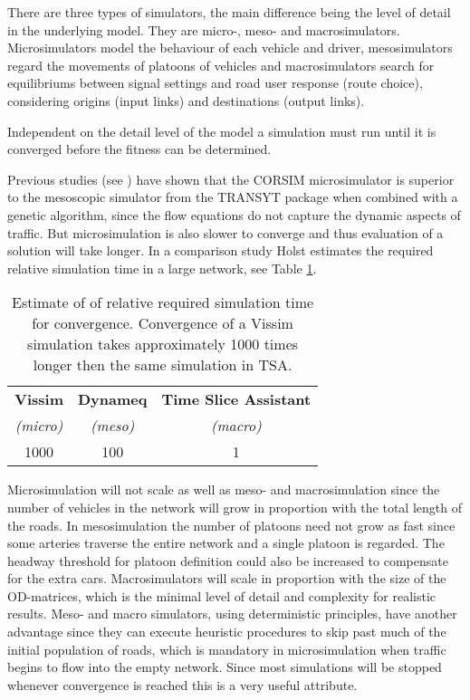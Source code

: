 There are three types of simulators, the main difference being the level of detail in the underlying model. They are micro-, meso- and macrosimulators. Microsimulators model the behaviour of each vehicle and driver, mesosimulators regard the movements of platoons of vehicles and macrosimulators search for equilibriums between signal settings and road user response (route choice), considering origins (input links) and destinations (output links).

Independent on the detail level of the model a simulation must run until it is converged before the fitness can be determined. 

Previous studies (see \cite{corsimvstransyt}) have shown that the CORSIM microsimulator is superior to the mesoscopic simulator from the TRANSYT package when combined with a genetic algorithm, since the flow equations do not capture the dynamic aspects of traffic. But microsimulation is also slower to converge and thus evaluation of a solution will take longer. In a comparison study \cite{simcompare} Holst estimates the required relative simulation time in a large network, see Table \ref{tab:convergespeed}.

\begin{table}[ht]
\centering
\begin{tabular}{c|c|c}
\textbf{Vissim} & \textbf{Dynameq} & \textbf{Time Slice Assistant} \\
\textit{(micro)} & \textit{(meso)} & \textit{(macro)} \\ \hline
1000 & 100 & 1
\end{tabular}
\caption{Estimate of of relative required simulation time for convergence. Convergence of a Vissim simulation takes approximately 1000 times longer then the same simulation in TSA.}
\label{tab:convergespeed}
\end{table}

Microsimulation will not scale as well as meso- and macrosimulation since the number of vehicles in the network will grow in proportion with the total length of the roads. In mesosimulation the number of platoons need not grow as fast since some arteries traverse the entire network and a single platoon is regarded. The headway threshold for platoon definition could also be increased to compensate for the extra cars. Macrosimulators will scale in proportion with the size of the OD-matrices, which is the minimal level of detail and complexity for realistic results. 
Meso- and macro simulators, using deterministic principles, have another advantage since they can execute heuristic procedures to skip past much of the initial population of roads, which is mandatory in microsimulation when traffic begins to flow into the empty network. Since most simulations will be stopped whenever convergence is reached this is a very useful attribute.

